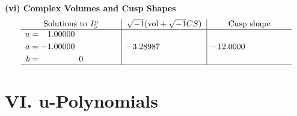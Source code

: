 \documentclass[1p]{elsarticle_modified}
\theoremstyle{definition}
\newcommand{\I}{\sqrt{-1}}
\begin{document}
\newpage\flushleft \textbf{(vi) Complex Volumes and Cusp Shapes}
$$\begin{array}{c|c|c}  
\text{Solutions to }I^u_{5}& \I (\text{vol} + \sqrt{-1}CS) & \text{Cusp shape}\\
 \hline 
\begin{aligned}
u &= \phantom{-}1.00000\phantom{ +0.000000I} \\
a &= -1.00000\phantom{ +0.000000I} \\
b &= \phantom{-0.000000 } 0\end{aligned}
 & -3.28987\phantom{ +0.000000I} & -12.0000\phantom{ +0.000000I}\\
 \hline 
 \end{array}$$\newpage
\newpage\renewcommand{\arraystretch}{1}
\centering \section*{ VI. u-Polynomials}
\end{document}
